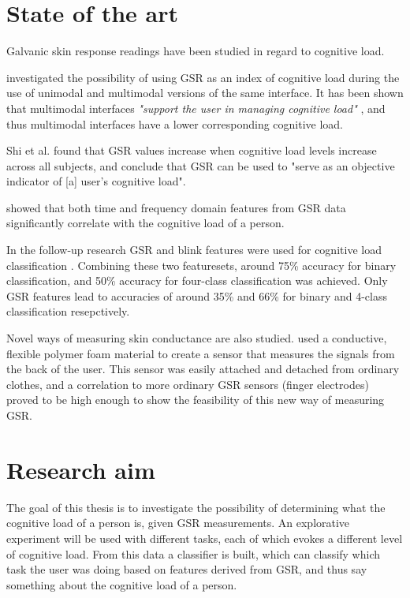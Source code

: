 \documentclass[11pt,leqno,a4paper]{report} %
\begin{document}
\section{State of the art}
Galvanic skin response readings have been studied in regard to cognitive load.

\citet{Shi2007} investigated the possibility of using GSR as an index of cognitive load during the use of unimodal and multimodal versions of the same interface. It has been shown that multimodal interfaces \textit{"support the user in managing cognitive load"} \citep{Oviatt2004}, and thus multimodal interfaces have a lower corresponding cognitive load. 

Shi et al. found that GSR values increase when cognitive load levels increase across all subjects, and conclude that GSR can be used to "serve as an objective indicator of [a] user's cognitive load".

\citet{Nourbakhsh2012} showed that both time and frequency domain features from GSR data significantly correlate with the cognitive load of a person.

In the follow-up research GSR and blink features were used for cognitive load classification \citep{Nourbakhsh2013}. Combining these two featuresets, around 75\% accuracy for binary classification, and 50\% accuracy for four-class classification was achieved. Only GSR features lead to accuracies of around 35\% and 66\% for binary and 4-class classification resepctively.

Novel ways of measuring skin conductance are also studied. \citet{A6945148} used a conductive, flexible polymer foam material to create a sensor that measures the signals from the back of the user. This sensor was easily attached and detached from ordinary clothes, and a correlation to more ordinary GSR sensors (finger electrodes) proved to be high enough to show the feasibility of this new way of measuring GSR.


\section{Research aim}
The goal of this thesis is to investigate the possibility of determining what the cognitive load of a person is, given GSR measurements. An explorative experiment will be used with different tasks, each of which evokes a different level of cognitive load. From this data a classifier is built, which can classify which task the user was doing based on features derived from GSR, and thus say something about the cognitive load of a person.
\end{document}
